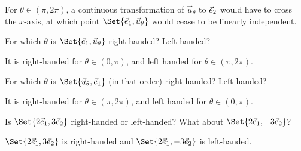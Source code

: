 \documentclass{workbook}
\begin{document}
\begin{slide}
\begin{parts}
\begin{solution}
				For $\theta\in(\pi,2\pi)$, a continuous transformation of
				$\vec u_\theta$	to ${\vec e_2}$ would have to cross the $x$-axis,
				at which point $\Set{\xhat,\vec u_\theta}$ would cease to be
				linearly independent.
			\end{solution}
		\item For which $\theta$ is $\Set{\xhat,\vec u_{\theta}}$ right-handed?
			Left-handed?
			\begin{solution}
				It is right-handed for $\theta\in(0, \pi)$, and left handed for
				$\theta\in(\pi,2\pi)$.
			\end{solution}
		\item For which $\theta$ is $\Set{\vec u_{\theta},\xhat}$ (in that order)
			right-handed? Left-handed?
			\begin{solution}
				It is right-handed for $\theta\in(\pi,2\pi)$, and left handed
				for $\theta\in(0,\pi)$.
			\end{solution}
		\item Is $\Set{2\xhat, 3\yhat}$ right-handed or left-handed? What about $\Set{2\xhat, -3\yhat}$?
			\begin{solution}
				$\Set{2\xhat, 3\yhat}$ is right-handed and $\Set{2\xhat, -3\yhat}$ is left-handed.
			\end{solution}
	\end{parts}

\end{slide}
\end{document}
